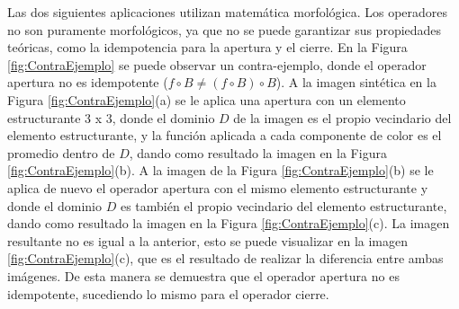 Las dos siguientes aplicaciones utilizan matemática morfológica. Los operadores no son puramente morfológicos, ya que no se puede garantizar sus propiedades teóricas, como la idempotencia para la apertura y el cierre. En la Figura \ref{fig:ContraEjemplo} se puede observar un contra-ejemplo, donde el operador apertura no es idempotente ($f\circ B \neq (f\circ B) \circ B$). A la imagen sintética en la Figura \ref{fig:ContraEjemplo}(a) se le aplica una apertura con un elemento estructurante 3 x 3, donde el dominio $D$ de la imagen es el propio vecindario del elemento estructurante, y la función aplicada a cada componente de color es el promedio dentro de $D$, dando como resultado la imagen en la Figura \ref{fig:ContraEjemplo}(b). A la imagen de la Figura \ref{fig:ContraEjemplo}(b) se le aplica de nuevo el operador apertura con el mismo elemento estructurante y donde el dominio $D$ es también el propio vecindario del elemento estructurante, dando como resultado la imagen en la Figura  \ref{fig:ContraEjemplo}(c). La imagen resultante no es igual a la anterior, esto se puede visualizar en la imagen \ref{fig:ContraEjemplo}(c), que es el resultado de realizar la diferencia entre ambas imágenes. De esta manera se demuestra que el operador apertura no es idempotente, sucediendo lo mismo para el operador cierre.


